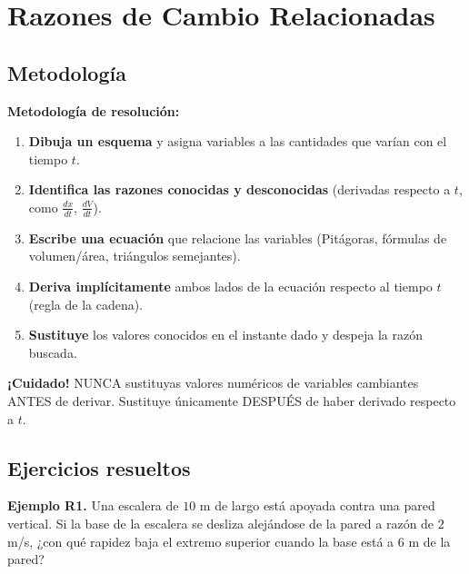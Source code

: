 \documentclass[12pt, letterpaper]{article}
\begin{document}

\section{Razones de Cambio Relacionadas}

\subsection{Metodología}

\begin{cuadroteoria}
  \textbf{Metodología de resolución:}
  \begin{enumerate}[leftmargin=*]
    \item \textbf{Dibuja un esquema} y asigna variables a las cantidades que varían con el tiempo $t$.
    \item \textbf{Identifica las razones conocidas y desconocidas} (derivadas respecto a $t$, como $\frac{dx}{dt}$, $\frac{dV}{dt}$).
    \item \textbf{Escribe una ecuación} que relacione las variables (Pitágoras, fórmulas de volumen/área, triángulos semejantes).
    \item \textbf{Deriva implícitamente} ambos lados de la ecuación respecto al tiempo $t$ (regla de la cadena).
    \item \textbf{Sustituye} los valores conocidos en el instante dado y despeja la razón buscada.
  \end{enumerate}
\end{cuadroteoria}

\begin{cuadroadvertencia}
  \textbf{¡Cuidado!} NUNCA sustituyas valores numéricos de variables cambiantes ANTES de derivar. Sustituye únicamente DESPUÉS de haber derivado respecto a $t$.
\end{cuadroadvertencia}

\subsection{Ejercicios resueltos}

\textbf{Ejemplo R1.} Una escalera de $10$ m de largo está apoyada contra una pared vertical. Si la base de la escalera se desliza alejándose de la pared a razón de $2$ m/s, ¿con qué rapidez baja el extremo superior cuando la base está a $6$ m de la pared?
\end{document}
